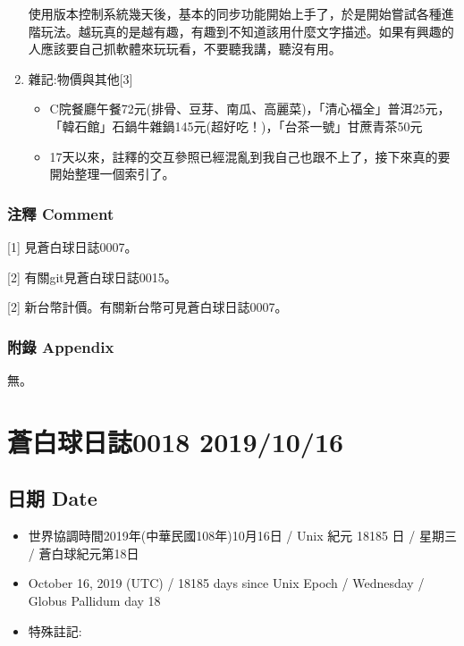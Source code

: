 \documentclass[a5paper, 12pt
]{book}
\providecommand{\tightlist}{%
  \setlength{\itemsep}{0pt}\setlength{\parskip}{0pt}}
\begin{document}
\begin{enumerate}
  使用版本控制系統幾天後，基本的同步功能開始上手了，於是開始嘗試各種進階玩法。越玩真的是越有趣，有趣到不知道該用什麼文字描述。如果有興趣的人應該要自己抓軟體來玩玩看，不要聽我講，聽沒有用。
\item
  雜記:物價與其他{[}3{]}

  \begin{itemize}
  \tightlist
  \item
    C院餐廳午餐72元(排骨、豆芽、南瓜、高麗菜)，「清心福全」普洱25元，「韓石館」石鍋牛雜鍋145元(超好吃！)，「台茶一號」甘蔗青茶50元
  \item
    17天以來，註釋的交互參照已經混亂到我自己也跟不上了，接下來真的要開始整理一個索引了。
  \end{itemize}
\end{enumerate}

\hypertarget{ux6ce8ux91cb-comment-10}{%
\subsubsection{注釋 Comment}\label{ux6ce8ux91cb-comment-10}}

{[}1{]} 見蒼白球日誌0007。

{[}2{]} 有關git見蒼白球日誌0015。

{[}2{]} 新台幣計價。有關新台幣可見蒼白球日誌0007。

\hypertarget{ux9644ux9304-appendix-9}{%
\subsubsection{附錄 Appendix}\label{ux9644ux9304-appendix-9}}

無。

\hypertarget{ux84bcux767dux7403ux65e5ux8a8c0018-20191016}{%
\section{蒼白球日誌0018
2019/10/16}\label{ux84bcux767dux7403ux65e5ux8a8c0018-20191016}}

\hypertarget{ux65e5ux671f-date-17}{%
\subsection{日期 Date}\label{ux65e5ux671f-date-17}}

\begin{itemize}
\tightlist
\item
  世界協調時間2019年(中華民國108年)10月16日 / Unix 紀元 18185 日 /
  星期三 / 蒼白球紀元第18日
\item
  October 16, 2019 (UTC) / 18185 days since Unix Epoch / Wednesday /
  Globus Pallidum day 18
\item
  特殊註記:
\end{itemize}
\end{document}
